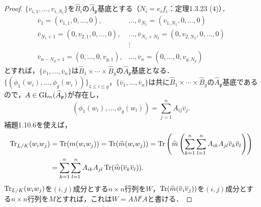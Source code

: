 \begin{proof}
  $\{v_{i,1},\ldots,v_{i,N_i}\}$を$\widehat{B}_i$の$\widehat{A}_\mathfrak{p}$基底とする（$N_i=e_if_i$：定理1.3.23 (4)）．
  \begin{align*}
    \overline{v}_1=(v_{1,1},0,\ldots,0),&\ldots,\overline{v}_{N_1}=(v_{1,N_1},0,\ldots,0)\\
    \overline{v}_{N_1+1}=(0,v_{2,1},0,\ldots,0),&\ldots,\overline{v}_{N_1+N_2}=(0,v_{2,N_2},0,\ldots,0)\\
    &\vdots\\
    \overline{v}_{n-N_g+1}=(0,\ldots,0,v_{g,1}),&\ldots,\overline{v}_{n}=(0,\ldots,0,v_{g,N_g})
  \end{align*}
  とすれば，$\{\overline{v}_1,\ldots,\overline{v}_n\}$は$\widehat{B}_1\times\cdots\times\widehat{B}_g$の$\widehat{A}_\mathfrak{p}$基底となる．
  $\{(\phi_1(w_i), \ldots, \phi_g(w_i))\}_{1 \leq i \leq g}$，$\{\overline{v}_1, \ldots, \overline{v}_n\}$は共に$\widehat{B}_1\times\cdots\times\widehat{B}_g$の$\widehat{A}_\mathfrak{p}$基底であるので，$A \in \operatorname{GL}_n(\widehat{A}_\mathfrak{p})$が存在し，
  \[(\phi_1(w_i), \ldots, \phi_g(w_i)) = \sum_{j=1}^n A_{ij} \overline{v}_j.\]
  補題1.10.6を使えば，
  \begin{align*}
    \operatorname{Tr}_{L/K}(w_iw_j) &= \operatorname{Tr}(m(w_i w_j)) = \operatorname{Tr}(\widehat{m}(w_i w_j)) = \operatorname{Tr}\left(\widehat{m}\left(\sum_{k=1}^n \sum_{l=1}^n A_{ik} A_{jl} \overline{v}_k \overline{v}_{l} \right) \right) \\
                      & = \sum_{k=1}^n \sum_{l=1}^n A_{ik} A_{jl} \operatorname{Tr}(\widehat{m}(\overline{v}_k \overline{v}_{l})).
  \end{align*}
  $\operatorname{Tr}_{L/K}(w_iw_j)$を$(i,j)$成分とする$n\times n$行列を$W$，$\operatorname{Tr}(\widehat{m}(\overline{v}_i \overline{v}_{j}))$を$(i,j)$成分とする$n\times n$行列を$M$とすれば，これは$W=AM{}^tA$と書ける．


\end{proof}
